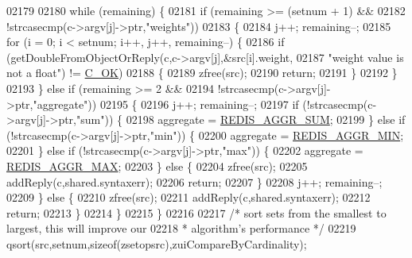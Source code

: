 \begin{DoxyCode}
02179 
02180         \textcolor{keywordflow}{while} (remaining) \{
02181             \textcolor{keywordflow}{if} (remaining >= (setnum + 1) &&
02182                 !strcasecmp(c->argv[j]->ptr,\textcolor{stringliteral}{"weights"}))
02183             \{
02184                 j++; remaining--;
02185                 \textcolor{keywordflow}{for} (i = 0; i < setnum; i++, j++, remaining--) \{
02186                     \textcolor{keywordflow}{if} (getDoubleFromObjectOrReply(c,c->argv[j],&src[i].weight,
02187                             \textcolor{stringliteral}{"weight value is not a float"}) != \hyperlink{server_8h_a303769ef1065076e68731584e758d3e1}{C\_OK})
02188                     \{
02189                         zfree(src);
02190                         \textcolor{keywordflow}{return};
02191                     \}
02192                 \}
02193             \} \textcolor{keywordflow}{else} \textcolor{keywordflow}{if} (remaining >= 2 &&
02194                        !strcasecmp(c->argv[j]->ptr,\textcolor{stringliteral}{"aggregate"}))
02195             \{
02196                 j++; remaining--;
02197                 \textcolor{keywordflow}{if} (!strcasecmp(c->argv[j]->ptr,\textcolor{stringliteral}{"sum"})) \{
02198                     aggregate = \hyperlink{t__zset_8c_a68af64a03a67d45bee92a8713f640ce8}{REDIS\_AGGR\_SUM};
02199                 \} \textcolor{keywordflow}{else} \textcolor{keywordflow}{if} (!strcasecmp(c->argv[j]->ptr,\textcolor{stringliteral}{"min"})) \{
02200                     aggregate = \hyperlink{t__zset_8c_a2da62788a46c712881bbcf613a98b3a9}{REDIS\_AGGR\_MIN};
02201                 \} \textcolor{keywordflow}{else} \textcolor{keywordflow}{if} (!strcasecmp(c->argv[j]->ptr,\textcolor{stringliteral}{"max"})) \{
02202                     aggregate = \hyperlink{t__zset_8c_a53a2a589750e7720bfc8feb9c1c4ec51}{REDIS\_AGGR\_MAX};
02203                 \} \textcolor{keywordflow}{else} \{
02204                     zfree(src);
02205                     addReply(c,shared.syntaxerr);
02206                     \textcolor{keywordflow}{return};
02207                 \}
02208                 j++; remaining--;
02209             \} \textcolor{keywordflow}{else} \{
02210                 zfree(src);
02211                 addReply(c,shared.syntaxerr);
02212                 \textcolor{keywordflow}{return};
02213             \}
02214         \}
02215     \}
02216 
02217     \textcolor{comment}{/* sort sets from the smallest to largest, this will improve our}
02218 \textcolor{comment}{     * algorithm's performance */}
02219     qsort(src,setnum,\textcolor{keyword}{sizeof}(zsetopsrc),zuiCompareByCardinality);

\end{DoxyCode}
